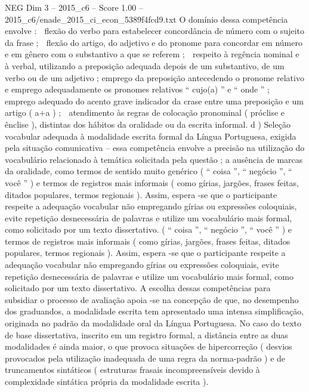 \begin{textsample}{NEG Dim 3 – 2015\_c6 – Score 1.00 – 2015\_c6/enade\_2015\_ci\_econ\_5389f4fcd9.txt}
O domínio dessa competência envolve :  flexão do verbo para estabelecer concordância de número com o sujeito da frase ;  flexão do artigo, do adjetivo e do pronome para concordar em número e em gênero com o substantivo a que se referem ;  respeito à regência nominal e à verbal, utilizando a preposição adequada depois de um substantivo, de um verbo ou de um adjetivo ; emprego da preposição antecedendo o pronome relativo e emprego adequadamente os pronomes relativos “ cujo(a) ” e “ onde ” ;  emprego adequado do acento grave indicador da crase entre uma preposição e um artigo ( a+a ) ;  atendimento às regras de colocação pronominal ( próclise e ênclise ), distintas dos hábitos da oralidade ou da escrita informal. d ) Seleção vocabular adequada à modalidade escrita formal da Língua Portuguesa, exigida pela situação comunicativa – essa competência envolve a precisão na utilização do vocabulário relacionado à temática solicitada pela questão ; a ausência de marcas da oralidade, como termos de sentido muito genérico ( “ coisa ”, “ negócio ”, “ você ” ) e termos de registros mais informais ( como gírias, jargões, frases feitas, ditados populares, termos regionais ).
Assim, espera -se que o participante respeite a adequação vocabular não empregando gírias ou expressões coloquiais, evite repetição desnecessária de palavras e utilize um vocabulário mais formal, como solicitado por um texto dissertativo. ( “ coisa ”, “ negócio ”, “ você ” ) e termos de registros mais informais ( como gírias, jargões, frases feitas, ditados populares, termos regionais ).
Assim, espera -se que o participante respeite a adequação vocabular não empregando gírias ou expressões coloquiais, evite repetição desnecessária de palavras e utilize um vocabulário mais formal, como solicitado por um texto dissertativo.
A escolha dessas competências para subsidiar o processo de avaliação apoia -se na concepção de que, no desempenho dos graduandos, a modalidade escrita tem apresentado uma intensa simplificação, originada no padrão da modalidade oral da Língua Portuguesa.
No caso do texto de base dissertativa, inscrito em um registro formal, a distância entre as duas modalidades é ainda maior, o que provoca situações de hipercorreção ( desvios provocados pela utilização inadequada de uma regra da norma-padrão ) e de truncamentos sintáticos ( estruturas frasais incompreensíveis devido à complexidade sintática própria da modalidade escrita ).

\end{textsample}
